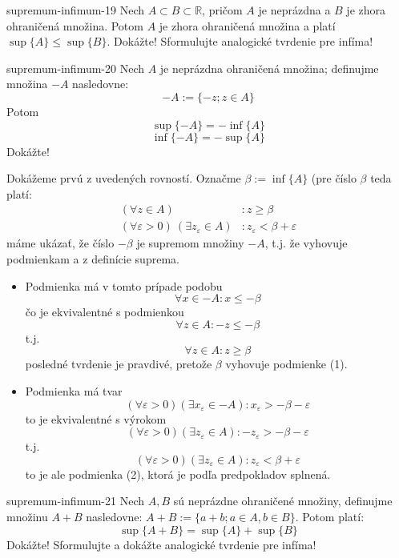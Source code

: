 \begin{defproblem}{supremum-infimum-19}
Nech $A \subset B \subset \mathbb{R}$, pričom $A$ je neprázdna a $B$ je zhora
ohraničená množina. Potom $A$ je zhora ohraničená množina a platí
$\sup\{A\} \leq \sup\{B\}$. Dokážte! Sformulujte analogické tvrdenie pre infíma!
\end{defproblem}

\begin{defproblem}{supremum-infimum-20}
Nech $A$ je neprázdna ohraničená množina; definujme množina $-A$ nasledovne:
$$-A := \{ -z; z \in A\}$$
Potom
$$\sup\{-A\} = -\inf\{A\}$$
$$\inf\{-A\} = -\sup\{A\}$$
Dokážte!

\begin{solution}
  Dokážeme prvú z uvedených rovností. Označme $\beta := \inf\{A\}$ (pre číslo
  $\beta$ teda platí:
  \begin{align*}
    (\forall z \in A)&: z \geq \beta \\
    (\forall \varepsilon > 0) \: (\exists z_\varepsilon \in A)&:
            z_\varepsilon < \beta + \varepsilon
  \end{align*}
  máme ukázať, že číslo $-\beta$ je supremom množiny $-A$, t.j. že vyhovuje
  podmienkam  a  z definície suprema.

  \begin{itemize}
    \item[\ding{34}]
      Podmienka má v tomto prípade podobu
      $$\forall x \in -A: x \leq -\beta$$
      čo je ekvivalentné s podmienkou
      $$\forall z \in A: -z \leq -\beta$$
      t.j.
      $$\forall z \in A: z \geq \beta$$
      posledné tvrdenie je pravdivé, pretože $\beta$ vyhovuje
      podmienke (1).
    \item[\ding{37}]
      Podmienka má tvar
      $$(\forall \varepsilon > 0) (\exists x_\varepsilon \in -A):
        x_\varepsilon > -\beta - \varepsilon$$
      to je ekvivalentné s výrokom
      $$(\forall \varepsilon > 0) (\exists z_\varepsilon \in A):
        -z_\varepsilon > -\beta - \varepsilon$$
      t.j.
      $$(\forall \varepsilon > 0) (\exists z_\varepsilon \in A):
        z_\varepsilon < \beta + \varepsilon$$
      to je ale podmienka (2), ktorá je podľa predpokladov splnená.
  \end{itemize}
\end{solution}

\end{defproblem}

\begin{defproblem}{supremum-infimum-21}
Nech $A, B$ sú neprázdne ohraničené množiny, definujme množinu $A + B$
nasledovne: $A + B := \{ a + b ; a \in A, b \in B \}$. Potom platí:
$$\sup\{A + B\} = \sup\{A\} + \sup\{B\}$$
Dokážte! Sformulujte a dokážte analogické tvrdenie pre infíma!
\end{defproblem}

